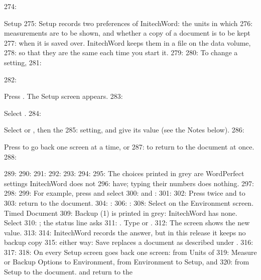 274: \begin{Feature}{Setup}
275: Setup records two preferences of InitechWord: the units in which
276: measurements are to be shown, and whether a copy of a document is to be kept
277: when it is saved over.  InitechWord keeps them in a file on the data volume,
278: so that they are the same each time you start it.
279: 
280: To change a setting,
281: \begin{WPSteps}
282: \item Press .  The Setup screen appears.
283: \item Select .
284: \item Select  or , then the
285: setting, and give its value (see the Notes below).
286: \item Press  to go back one screen at a time, or 
287: to return to the document at once.
288: \end{WPSteps}
289: 
290: 
291: 
292: 
293: 
294: 
295: The choices printed in grey are WordPerfect settings InitechWord does not
296: have; typing their numbers does nothing.
297: 
298: 
299: For example, press  and select
300:  and :
301: 
302: Press  twice and  to
303: return to the document.
304: : 
306: : 
308: Select  on the Environment screen.  Timed Document
309: Backup (1) is printed in grey: InitechWord has none.  Select
310: ; the status line asks
311: .  Type  or .
312: The screen shows the new value.
313: 
314: InitechWord records the answer, but in this release it keeps no backup copy
315: either way: Save replaces a document as described under .
316: 
317: 
318: On every Setup screen  goes back one screen: from Units of
319: Measure or Backup Options to Environment, from Environment to Setup, and
320: from Setup to the document.   and  return to the

\end{Feature}
